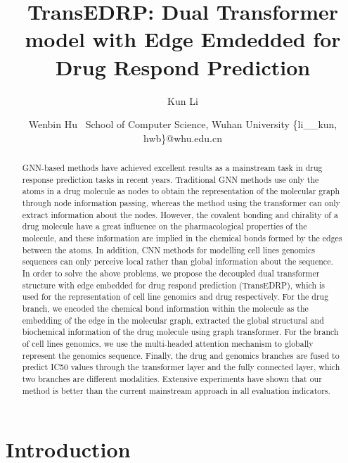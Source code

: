 \documentclass{article}
\title{TransEDRP: Dual Transformer model with Edge Emdedded for Drug Respond Prediction}
\author{
Kun Li
\and
Wenbin Hu\
\affiliations
School of Computer Science, Wuhan University
\emails
\{li\_\_kun, hwb\}@whu.edu.cn
}
\begin{document}
\maketitle

\begin{abstract}


GNN-based methods have achieved excellent results as a mainstream task in drug response prediction tasks in recent years. Traditional GNN methods use only the atoms in a drug molecule as nodes to obtain the representation of the molecular graph through node information passing, whereas the method using the transformer can only extract information about the nodes. However, the covalent bonding and chirality of a drug molecule have a great influence on the pharmacological properties of the molecule, and these information are implied in the chemical bonds formed by the edges between the atoms. In addition, CNN methods for modelling cell lines genomics sequences can only perceive local rather than global information about the sequence. In order to solve the above problems, we propose the decoupled dual  transformer structure with edge embedded for drug respond prediction (TransEDRP), which is used for the representation of cell line genomics and drug respectively. For the drug branch, we encoded the chemical bond information within the molecule as the embedding of the edge in the molecular graph, extracted the global structural and biochemical information of the drug molecule using graph transformer. For the branch of cell lines genomics, we use the multi-headed attention mechanism to globally represent the genomics sequence. Finally, the drug and genomics branches are fused to predict IC50 values through the transformer layer and the fully connected layer, which two branches are different modalities. Extensive experiments have shown that our method is better than the current mainstream approach in all evaluation indicators.















\end{abstract}

\section{Introduction}
\end{document}
